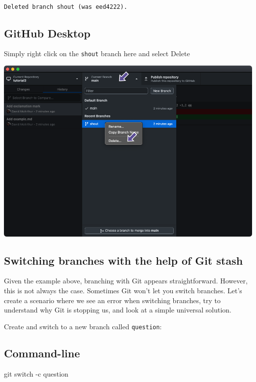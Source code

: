 \documentclass[
  letterpaper,
  DIV=11,
  numbers=noendperiod]{scrartcl}
\newenvironment{Shaded}{\begin{snugshade}}{\end{snugshade}}
\newcommand{\AttributeTok}[1]{\textcolor[rgb]{0.40,0.45,0.13}{#1}}
\newcommand{\FunctionTok}[1]{\textcolor[rgb]{0.28,0.35,0.67}{#1}}
\newcommand{\NormalTok}[1]{\textcolor[rgb]{0.00,0.23,0.31}{#1}}
\begin{document}
\begin{verbatim}

Deleted branch shout (was eed4222).
\end{verbatim}

\subsection{GitHub Desktop}

Simply right click on the \texttt{shout} branch here and select Delete

\includegraphics{images/image36.png}

\subsection{Switching branches with the help of Git
stash}\label{switching-branches-with-the-help-of-git-stash}

Given the example above, branching with Git appears straightforward.
However, this is not always the case. Sometimes Git won't let you switch
branches. Let's create a scenario where we see an error when switching
branches, try to understand why Git is stopping us, and look at a simple
universal solution.

Create and switch to a new branch called \texttt{question}:

\subsection{Command-line}

\begin{Shaded}
\begin{Highlighting}[]
\FunctionTok{git}\NormalTok{ switch }\AttributeTok{{-}c}\NormalTok{ question}
\end{Highlighting}
\end{Shaded}
\end{document}
